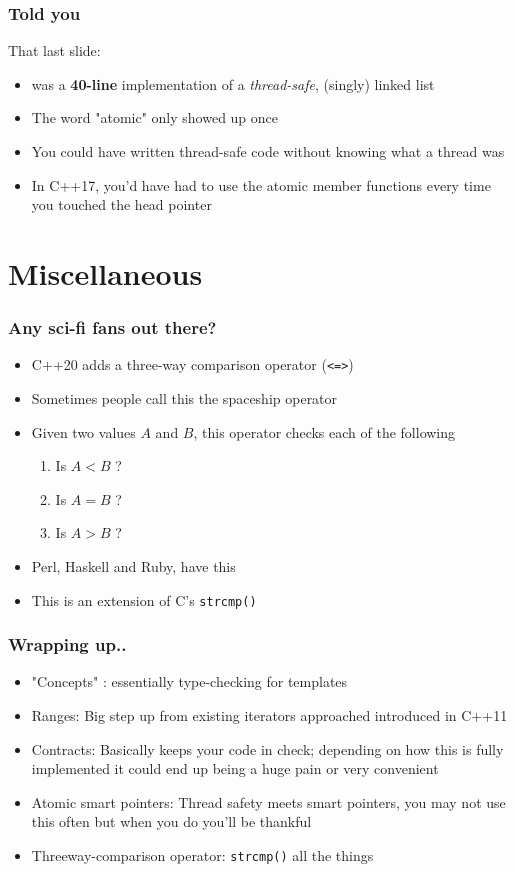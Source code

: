 \documentclass{beamer}
\begin{document}
\begin{frame}
\frametitle{Told you}

That last slide:

\begin{itemize}
\setlength\itemsep{2em}
\item was a 
\textbf{40-line} implementation of a \emph{thread-safe}, (singly) linked list
\item The word "atomic" only showed up once
\item You could have written thread-safe code without knowing what a thread was
\item In C++17, you'd have had to use the atomic member functions every time you touched the head pointer
\end{itemize}

\end{frame}

\section{Miscellaneous}

\begin{frame}
\frametitle{Any sci-fi fans out there?}
\begin{itemize}
\setlength\itemsep{2em}
\item C++20 adds a three-way comparison operator (\texttt{<=>})
\item Sometimes people call this the spaceship operator
\item Given two values $A$ and $B$, this operator checks each of the following
\begin{enumerate}
\item Is $A < B$ ?
\item Is $A = B$ ?
\item Is $A > B$ ?
\end{enumerate}

\item Perl, Haskell and Ruby, have this

\item This is an extension of C's \texttt{strcmp()}
\end{itemize}
\end{frame}

\begin{frame}
\frametitle{Wrapping up..}

\begin{itemize}
\setlength\itemsep{1.5em}
\item "Concepts" : essentially type-checking for templates
\item Ranges: Big step up from existing iterators approached introduced in C++11
\item Contracts: Basically keeps your code in check; depending on how this is fully implemented it could end up being a huge pain or very convenient
\item Atomic smart pointers: Thread safety meets smart pointers, you may not use this often but when you do you'll be thankful
\item Threeway-comparison operator: \texttt{strcmp()} all the things
\end{itemize}
\end{frame}
\end{document}
